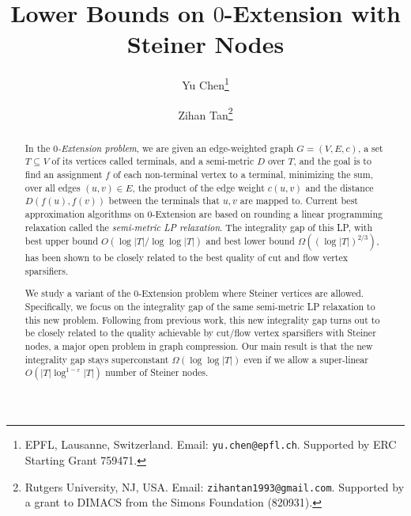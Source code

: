 \documentclass[11pt]{article}
\theoremstyle{definition}
\begin{document}
\begin{titlepage}
	
	\title{Lower Bounds on $0$-Extension with Steiner Nodes}
	
	\author{Yu Chen\thanks{EPFL, Lausanne, Switzerland. Email: {\tt yu.chen@epfl.ch}. Supported by ERC Starting Grant 759471.} \and Zihan Tan\thanks{Rutgers University, NJ, USA. Email: {\tt zihantan1993@gmail.com}. Supported by a grant to DIMACS from the Simons Foundation (820931).}} 
	
	\maketitle
	
	
	\thispagestyle{empty}
	\begin{abstract}
		
In the \emph{$0$-Extension problem}, we are given an edge-weighted graph $G=(V,E,c)$, a set $T\subseteq V$ of its vertices called terminals, and a semi-metric $D$ over $T$, and the goal is to find an assignment $f$ of each non-terminal vertex to a terminal, minimizing the sum, over all edges $(u,v)\in E$, the product of the edge weight $c(u,v)$ and the distance $D(f(u),f(v))$ between the terminals that $u,v$ are mapped to.
Current best approximation algorithms on $0$-Extension are based on rounding a linear programming relaxation called the \emph{semi-metric LP relaxation}. The integrality gap of this LP, with best upper bound $O(\log |T|/\log\log |T|)$ and best lower bound $\Omega((\log |T|)^{2/3})$, has been shown to be closely related to the best quality of cut and flow vertex sparsifiers.

We study a variant of the $0$-Extension problem where Steiner vertices are allowed. Specifically, we focus on the integrality gap of the same semi-metric LP relaxation to this new problem. 
Following from previous work, this new integrality gap turns out to be closely related to the quality achievable by cut/flow vertex sparsifiers with Steiner nodes, a major open problem in graph compression. 
Our main result is that the new integrality gap stays superconstant $\Omega(\log\log |T|)$ even if we allow a super-linear $O(|T|\log^{1-\varepsilon}|T|)$ number of Steiner nodes.
		
		
		
		
		
		
		
		
		
	\end{abstract}




\end{titlepage}
\end{document}

